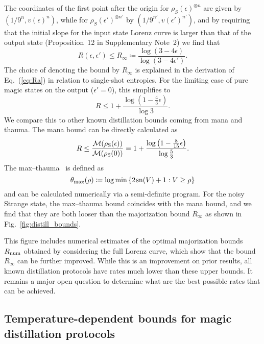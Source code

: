 \documentclass[
onecolumn,
superscriptaddress
]{revtex4-1}
\def\M{{\cal M}}
\begin{document}
The coordinates of the first point after the origin for $\rho_S(\epsilon)^{\otimes n}$ are given by $(1/9^n, v(\epsilon)^n)$, while for $\rho_S(\epsilon')^{\otimes n'}$ by $(1/9^{n'}, v(\epsilon')^{n'})$, and by requiring that the initial slope for the input state Lorenz curve is larger than that of the output state (Proposition~12 in Supplementary Note~2) we find that
\begin{equation}\label{eq:unital-bound}
	R(\epsilon, \epsilon') \leq R_\infty \coloneqq\frac{\log (3-4\epsilon)}{\log (3-4\epsilon')}.
\end{equation}
The choice of denoting the bound by $R_\infty$ is explained in the derivation of Eq.~(\ref{eq:Ra}) in relation to single-shot entropies. For the limiting case of pure magic states on the output ($\epsilon'=0$), this simplifies to
\begin{equation}
	R \leq 1 + \frac{\log (1 - \frac{4}{3} \epsilon)}{\log 3}.
\end{equation}
We compare this to other known distillation bounds coming from mana and thauma. The mana bound can be directly calculated as
\begin{equation}
	R \leq \frac{\M(\rho_{\rm{S}}(\epsilon))}{\M(\rho_{\rm{S}}(0))} = 1 + \frac{\log \left(1 - \frac{8}{15}\epsilon \right)}{\log \frac{5}{3}}.
\end{equation}
The max--thauma~\cite{Wang_2020} is defined as
\begin{equation}
	\theta_{\rm{max}}(\rho) \coloneqq \log \min{\{2\hspace{1pt}{\rm sn}(V)+1 : V \geq \rho\}}
\end{equation}
and can be calculated numerically via a semi-definite program. For the noisy Strange state, the max--thauma bound coincides with the mana bound, and we find that they are both looser than the majorization bound $R_\infty$ as shown in Fig.~\ref{fig:distill_bounds}. 

This figure includes numerical estimates of the optimal majorization bounds $R_{\rm{num}}$ obtained by considering the full Lorenz curve, which show that the bound $R_\infty$ can be further improved. While this is an improvement on prior results,  all known distillation protocols have rates much lower than these upper bounds.  It remains a major open question to determine what are the best possible rates that can be achieved.

\subsection*{Temperature-dependent bounds for magic distillation protocols}
\end{document}
